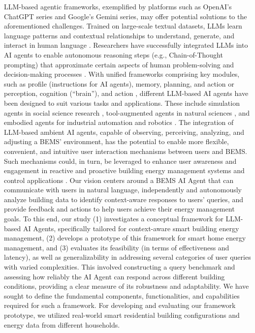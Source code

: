 \documentclass[final,3p,times]{elsarticle}
\begin{document}
LLM-based agentic frameworks, exemplified by platforms such as OpenAI's ChatGPT series and Google's Gemini series, may offer potential solutions to the aforementioned challenges. Trained on large-scale textual datasets, LLMs learn language patterns and contextual relationships to understand, generate, and interact in human language \cite{brown2020language}. Researchers have successfully integrated LLMs into AI agents to enable autonomous reasoning steps (e.g., Chain-of-Thought prompting) that approximate certain aspects of human problem-solving and decision-making processes \cite{xi2023rise, wang2024survey}. With unified frameworks comprising key modules, such as profile (instructions for AI agents), memory, planning, and action \cite{wang2024survey} or perception, cognition (``brain''), and action \cite{xi2023rise}, different LLM-based AI agents have been designed to suit various tasks and applications. These include simulation agents in social science research \cite{kovavc2023socialai, li2023you}, tool-augmented agents in natural sciences \cite{boiko2023emergent, bran2023chemcrow}, and embodied agents for industrial automation and robotics \cite{mandi2023roco, rana2023sayplan, wu2023tidybot}. The integration of LLM-based ambient AI agents, capable of observing, perceiving, analyzing, and adjusting a BEMS' environment, has the potential to enable more flexible, convenient, and intuitive user interaction mechanisms between users and BEMS. Such mechanisms could, in turn, be leveraged to enhance user awareness and engagement in reactive and proactive building energy management systems and control applications \cite{king2024sasha}. Our vision centers around a BEMS AI Agent that can communicate with users in natural language, independently and autonomously analyze building data to identify context-aware responses to users' queries, and provide feedback and actions to help users achieve their energy management goals. To this end, our study (1) investigates a conceptual framework for LLM-based AI Agents, specifically tailored for context-aware smart building energy management, (2) develops a prototype of this framework for smart home energy management, and (3) evaluates its feasibility (in terms of effectiveness and latency), as well as generalizability in addressing several categories of user queries with varied complexities. This involved constructing a query benchmark and assessing how reliably the AI Agent can respond across different building conditions, providing a clear measure of its robustness and adaptability. We have sought to define the fundamental components, functionalities, and capabilities required for such a framework. For developing and evaluating our framework prototype, we utilized real-world smart residential building configurations and energy data from different households.
\end{document}
